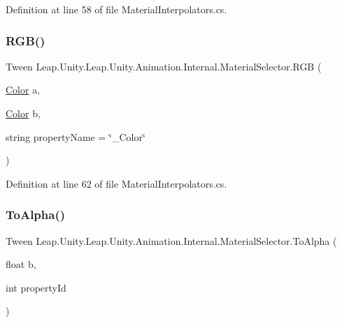 Definition at line 58 of file Material\+Interpolators.\+cs.

\mbox{\label{struct_leap_1_1_unity_1_1_leap_1_1_unity_1_1_animation_1_1_internal_1_1_material_selector_ac88853057ca61f0d413037071d849332}} 
\subsubsection{\texorpdfstring{RGB()}{RGB()}\hspace{0.1cm}{\footnotesize\ttfamily [2/2]}}
{\footnotesize\ttfamily Tween Leap.\+Unity.\+Leap.\+Unity.\+Animation.\+Internal.\+Material\+Selector.\+R\+GB (\begin{DoxyParamCaption}\item[{\mbox{\hyperlink{struct_leap_1_1_unity_1_1_leap_1_1_unity_1_1_animation_1_1_internal_1_1_material_selector_a4cee2e1cf1062ce91d3e8930fc5b838b}{Color}}}]{a,  }\item[{\mbox{\hyperlink{struct_leap_1_1_unity_1_1_leap_1_1_unity_1_1_animation_1_1_internal_1_1_material_selector_a4cee2e1cf1062ce91d3e8930fc5b838b}{Color}}}]{b,  }\item[{string}]{property\+Name = {\ttfamily \char`\"{}\+\_\+Color\char`\"{}} }\end{DoxyParamCaption})}



Definition at line 62 of file Material\+Interpolators.\+cs.

\mbox{\label{struct_leap_1_1_unity_1_1_leap_1_1_unity_1_1_animation_1_1_internal_1_1_material_selector_a7194c15fb21d203c9fe3b1e2d7287e1e}} 
\subsubsection{\texorpdfstring{ToAlpha()}{ToAlpha()}\hspace{0.1cm}{\footnotesize\ttfamily [1/2]}}
{\footnotesize\ttfamily Tween Leap.\+Unity.\+Leap.\+Unity.\+Animation.\+Internal.\+Material\+Selector.\+To\+Alpha (\begin{DoxyParamCaption}\item[{float}]{b,  }\item[{int}]{property\+Id }\end{DoxyParamCaption})}



